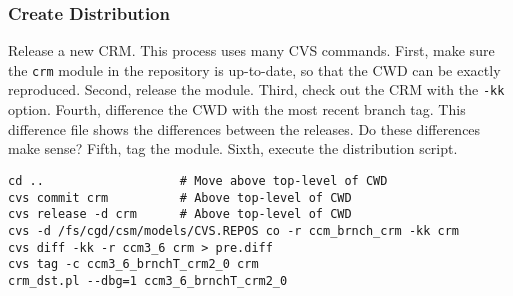 \documentclass[12pt,twoside]{article}
\begin{document}
\subsubsection[Create Distribution]{Create Distribution}
Release a new CRM.
This process uses many CVS commands.
First, make sure the \verb'crm' module in the repository is
up-to-date, so that the CWD can be exactly reproduced.
Second, release the module. 
Third, check out the CRM with the \verb'-kk' option. 
Fourth, difference the CWD with the most recent branch tag.
This difference file shows the differences between the releases.
Do these differences make sense?
Fifth, tag the module.
Sixth, execute the distribution script.
\begin{verbatim}
cd ..                   # Move above top-level of CWD
cvs commit crm          # Above top-level of CWD
cvs release -d crm      # Above top-level of CWD
cvs -d /fs/cgd/csm/models/CVS.REPOS co -r ccm_brnch_crm -kk crm
cvs diff -kk -r ccm3_6 crm > pre.diff
cvs tag -c ccm3_6_brnchT_crm2_0 crm
crm_dst.pl --dbg=1 ccm3_6_brnchT_crm2_0
\end{verbatim}
\end{document}
